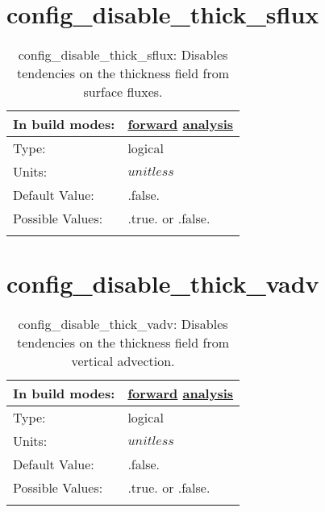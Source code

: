 \section[config\_disable\_thick\_sflux]{config\_disable\_thick\_sflux}
\label{sec:nm_sec_config_disable_thick_sflux}
\begin{center}
\begin{longtable}{| p{2.0in} || p{4.0in} |}
    \hline
    In build modes: & \hyperref[subsec:forward_nm_tab_debug]{forward} \hyperref[subsec:analysis_nm_tab_debug]{analysis} \\
    \hline
    Type: & logical \\
    \hline
    Units: & $unitless$ \\
    \hline
    Default Value: & .false. \\
    \hline
    Possible Values: & .true. or .false. \\
    \hline
    \caption{config\_disable\_thick\_sflux: Disables tendencies on the thickness field from surface fluxes.}
\end{longtable}
\end{center}
\section[config\_disable\_thick\_vadv]{config\_disable\_thick\_vadv}
\label{sec:nm_sec_config_disable_thick_vadv}
\begin{center}
\begin{longtable}{| p{2.0in} || p{4.0in} |}
    \hline
    In build modes: & \hyperref[subsec:forward_nm_tab_debug]{forward} \hyperref[subsec:analysis_nm_tab_debug]{analysis} \\
    \hline
    Type: & logical \\
    \hline
    Units: & $unitless$ \\
    \hline
    Default Value: & .false. \\
    \hline
    Possible Values: & .true. or .false. \\
    \hline
    \caption{config\_disable\_thick\_vadv: Disables tendencies on the thickness field from vertical advection.}
\end{longtable}
\end{center}
